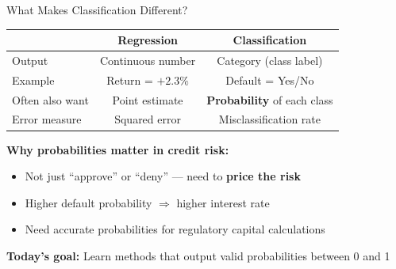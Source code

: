 \documentclass[10pt]{beamer}
\newcommand{\highlight}[1]{\textcolor{AccentOrange}{\textbf{#1}}}
\begin{document}
\begin{frame}{What Makes Classification Different?}

  \begin{center}
  \begin{tabular}{lcc}
    \toprule
    & \textbf{Regression} & \textbf{Classification} \\
    \midrule
    Output & Continuous number & Category (class label) \\
    Example & Return = $+2.3\%$ & Default = Yes/No \\
    Often also want & Point estimate & \highlight{Probability} of each class \\
    Error measure & Squared error & Misclassification rate \\
    \bottomrule
  \end{tabular}
  \end{center}

  \vspace{1em}
  \textbf{Why probabilities matter in credit risk:}
  \begin{itemize}
    \item Not just ``approve'' or ``deny'' --- need to \highlight{price the risk}
    \item Higher default probability $\Rightarrow$ higher interest rate
    \item Need accurate probabilities for regulatory capital calculations
  \end{itemize}

  \vspace{0.5em}
  \textbf{Today's goal:} Learn methods that output valid probabilities between 0 and 1
\end{frame}
\end{document}

